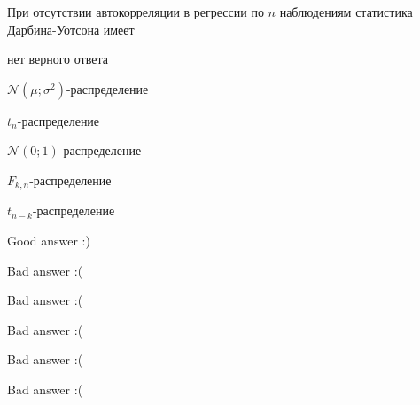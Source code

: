 
\begin{question}
При отсутствии автокорреляции в регрессии по \(n\) наблюдениям статистика Дарбина-Уотсона имеет
\begin{answerlist}
  \item нет верного ответа
  \item \(\mathcal{N}(\mu;\sigma^2)\)-распределение
  \item \(t_n\)-распределение
  \item \(\mathcal{N}(0;1)\)-распределение
  \item \(F_{k,n}\)-распределение
  \item \(t_{n-k}\)-распределение
\end{answerlist}
\end{question}

\begin{solution}
\begin{answerlist}
  \item Good answer :)
  \item Bad answer :(
  \item Bad answer :(
  \item Bad answer :(
  \item Bad answer :(
  \item Bad answer :(
\end{answerlist}
\end{solution}

